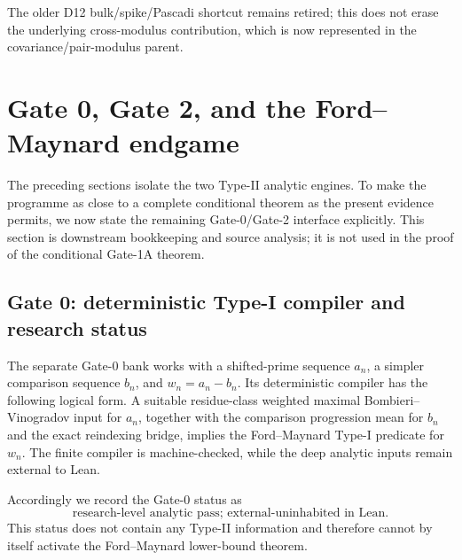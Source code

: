 \documentclass[11pt]{article}
\theoremstyle{definition}
\newcommand{\1}{\mathbf 1}
\begin{document}
The older D12 bulk/spike/Pascadi shortcut remains retired; this does not erase
the underlying cross-modulus contribution, which is now represented in the
covariance/pair-modulus parent.

\section{Gate 0, Gate 2, and the Ford--Maynard endgame}
\label{sec:gate02}

The preceding sections isolate the two Type-II analytic engines.  To make the
programme as close to a complete conditional theorem as the present evidence
permits, we now state the remaining Gate-0/Gate-2 interface explicitly.  This
section is downstream bookkeeping and source analysis; it is not used in the
proof of the conditional Gate-1A theorem.

\subsection{Gate 0: deterministic Type-I compiler and research status}
The separate Gate-0 bank works with a shifted-prime sequence $a_n$, a simpler
comparison sequence $b_n$, and $w_n=a_n-b_n$.  Its deterministic compiler has
the following logical form.  A suitable residue-class weighted maximal
Bombieri--Vinogradov input for $a_n$, together with the comparison progression
mean for $b_n$ and the exact reindexing bridge, implies the Ford--Maynard Type-I
predicate for $w_n$.  The finite compiler is machine-checked, while the deep
analytic inputs remain external to Lean.

Accordingly we record the Gate-0 status as
\[
 \boxed{\text{research-level analytic pass; external-uninhabited in Lean}.}
\]
This status does not contain any Type-II information and therefore cannot by
itself activate the Ford--Maynard lower-bound theorem.
\end{document}

